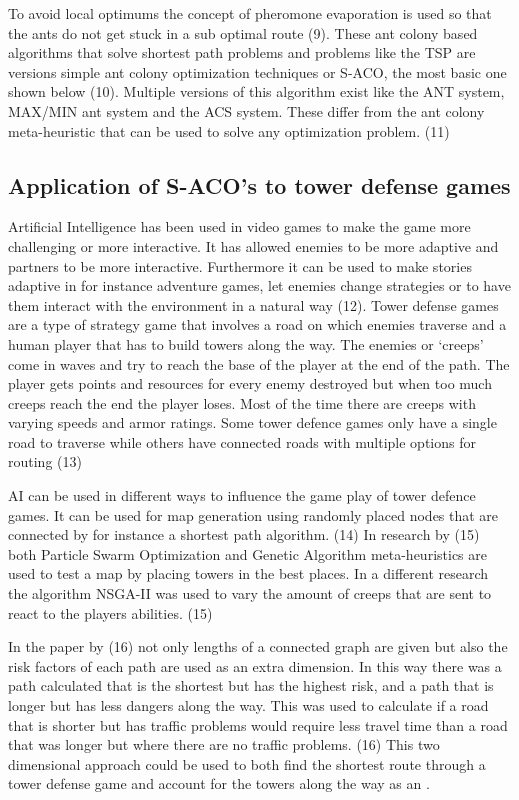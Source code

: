 To avoid local optimums the concept of pheromone evaporation is used so that the ants do not get stuck in a sub optimal route (9). These ant colony based algorithms that solve shortest path problems and problems like the TSP are versions simple ant colony optimization techniques or S-ACO, the most basic one shown below (10).  Multiple versions of this algorithm exist like the ANT system, MAX/MIN ant system and the ACS system. These differ from the ant colony meta-heuristic that can be used to solve any optimization problem. (11)

\subsection {Application of S-ACO’s to tower defense games}

Artificial Intelligence has been used in video games to make the game more challenging or more interactive. It has allowed enemies to be more adaptive and partners to be more interactive. Furthermore it can be used to make stories adaptive in for instance adventure games, let enemies change strategies or to have them interact with the environment in a natural way (12). Tower defense games are a type of strategy game that involves a road on which enemies traverse and a human player that has to build towers along the way. The enemies or ‘creeps’ come in waves and try to reach the base of the player at the end of the path. The player gets points and resources for every enemy destroyed but when too much creeps reach the end the player loses. Most of the time there are creeps with varying speeds and armor ratings. Some tower defence games only have a single road to traverse while others have connected roads with multiple options for routing (13)

AI can be used in different ways to influence the game play of tower defence games. It can be used for map generation using randomly placed nodes that are connected by for instance a shortest path algorithm. (14) In research by (15) both Particle Swarm Optimization and Genetic Algorithm meta-heuristics are used to test a map by placing towers in the best places. In a different research the algorithm NSGA-II was used to vary the amount of creeps that are sent to react to the players abilities. (15)  

In the paper by (16) not only lengths of a connected graph are given but also the risk factors of each path are used as an extra dimension. In this way there was a path calculated that is the shortest but has the highest risk, and a path that is longer but has less dangers along the way. This was used to calculate if a road that is shorter but has traffic problems would require less travel time than a road that was longer but where there are no traffic problems. (16) This two dimensional approach could be used to both find the shortest route through a tower defense game and account for the towers along the way as an . 
